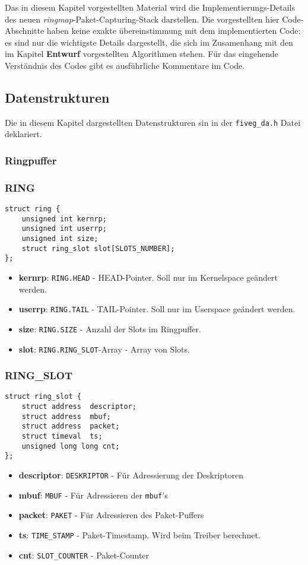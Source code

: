 \lstset{language=C}
Das in diesem Kapitel vorgestellten Material wird die Implementierungs-Details
des neuen \emph{ringmap}-Paket-Capturing-Stack darstellen. Die vorgestellten hier Code-Abschnitte
haben keine exakte übereinstimmung mit dem implementierten Code: es sind nur
die wichtigste Details dargestellt, die sich im Zusamenhang mit den im Kapitel
\textbf{Entwurf} vorgestellten Algorithmen stehen. Für das eingehende
Verständnis des Codes gibt es ausführliche Kommentare im Code.

\subsection{Datenstrukturen}
Die in diesem Kapitel dargestellten Datenstrukturen sin in der \verb+fiveg_da.h+ Datei deklariert. 
\subsubsection{Ringpuffer}
\subsubsection*{RING}
\begin{lstlisting}[frame=single, caption={RING-Struktur}, captionpos={b}, label={code:ring_struct}]
struct ring {
	unsigned int kernrp;
	unsigned int userrp;
	unsigned int size;
	struct ring_slot slot[SLOTS_NUMBER];
};
\end{lstlisting}
\begin{itemize}
	\item \textbf{kernrp}: \verb+RING.HEAD+ - HEAD-Pointer. Soll nur im Kernelspace geändert werden. 
	\item \textbf{userrp}: \verb+RING.TAIL+ - TAIL-Pointer. Soll nur im Userspace geändert werden.
	\item \textbf{size}: \verb+RING.SIZE+ - Anzahl der Slots im Ringpuffer.
	\item \textbf{slot}: \verb+RING.RING_SLOT+-Array - Array von Slots. 
\end{itemize}
\subsubsection*{RING\_SLOT}
\begin{lstlisting}[frame=single, caption={RING-SLOT-Struktur}, captionpos={b}, label={code:ring_slot_struct}]
struct ring_slot {
	struct address 	descriptor;
	struct address 	mbuf;
	struct address	packet;
	struct timeval	ts;
	unsigned long long cnt;
};
\end{lstlisting}
\begin{itemize}
	\item \textbf{descriptor}: \verb+DESKRIPTOR+ - Für Adressierung der Deskriptoren
	\item \textbf{mbuf}: \verb+MBUF+ - Für Adressieren der \verb+mbuf+'s
	\item \textbf{packet}: \verb+PAKET+ -  Für Adressieren des Paket-Puffers
	\item \textbf{ts}: \verb+TIME_STAMP+ - Paket-Timestamp. Wird beim Treiber berechnet.
	\item \textbf{cnt}: \verb+SLOT_COUNTER+ - Paket-Counter
\end{itemize}
